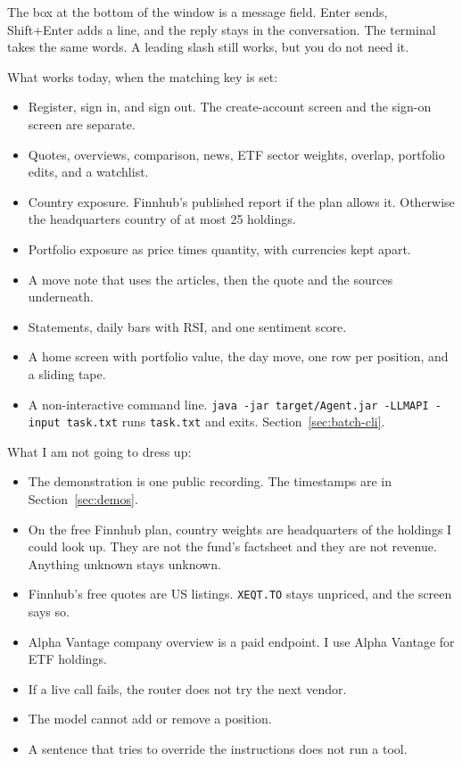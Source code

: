 \documentclass[11pt]{article}
\begin{document}
The box at the bottom of the window is a message field. Enter sends, Shift+Enter adds a line, and the reply stays in the conversation. The terminal takes the same words. A leading slash still works, but you do not need it.

What works today, when the matching key is set:

\begin{itemize}
\item Register, sign in, and sign out. The create-account screen and the sign-on screen are separate.
\item Quotes, overviews, comparison, news, ETF sector weights, overlap, portfolio edits, and a watchlist.
\item Country exposure. Finnhub's published report if the plan allows it. Otherwise the headquarters country of at most 25 holdings.
\item Portfolio exposure as price times quantity, with currencies kept apart.
\item A move note that uses the articles, then the quote and the sources underneath.
\item Statements, daily bars with RSI, and one sentiment score.
\item A home screen with portfolio value, the day move, one row per position, and a sliding tape.
\item A non-interactive command line. \texttt{java -jar target/Agent.jar -LLMAPI -input task.txt} runs \texttt{task.txt} and exits. Section~\ref{sec:batch-cli}.
\end{itemize}

What I am not going to dress up:

\begin{itemize}
\item The demonstration is one public recording. The timestamps are in Section~\ref{sec:demos}.
\item On the free Finnhub plan, country weights are headquarters of the holdings I could look up. They are not the fund's factsheet and they are not revenue. Anything unknown stays unknown.
\item Finnhub's free quotes are US listings. \texttt{XEQT.TO} stays unpriced, and the screen says so.
\item Alpha Vantage company overview is a paid endpoint. I use Alpha Vantage for ETF holdings.
\item If a live call fails, the router does not try the next vendor.
\item The model cannot add or remove a position.
\item A sentence that tries to override the instructions does not run a tool.
\end{itemize}
\end{document}

